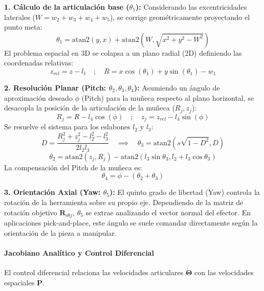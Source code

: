 \documentclass[12pt, a4paper]{article}
\begin{document}
\textbf{1. Cálculo de la articulación base ($\theta_1$):} 
Considerando las excentricidades laterales ($W = w_2 + w_3 + w_4 + w_5$), se corrige geométricamente proyectando el punto meta:
\begin{equation}
    \theta_1 = \text{atan2}(y, x) + \text{atan2}\left(W, \sqrt{x^2 + y^2 - W^2}\right)
\end{equation}
El problema espacial en 3D se colapsa a un plano radial (2D) definiendo las coordenadas relativas:
\begin{equation}
    z_{rel} = z - l_1 \quad ; \quad R = x\cos(\theta_1) + y\sin(\theta_1) - w_1
\end{equation}

\textbf{2. Resolución Planar (Pitch: $\theta_2, \theta_3, \theta_4$):}
Asumiendo un ángulo de aproximación deseado $\phi$ (Pitch) para la muñeca respecto al plano horizontal, se desacopla la posición de la articulación de la muñeca ($R_j, z_j$):
\begin{equation}
    R_j = R - l_4 \cos(\phi) \quad ; \quad z_j = z_{rel} - l_4 \sin(\phi)
\end{equation}
Se resuelve el sistema para los eslabones $l_2$ y $l_3$:
\begin{equation}
    D = \frac{R_j^2 + z_j^2 - l_2^2 - l_3^2}{2 l_2 l_3} \quad \implies \quad \theta_3 = \text{atan2}\left(s\sqrt{1 - D^2}, D\right)
\end{equation}
\begin{equation}
    \theta_2 = \text{atan2}(z_j, R_j) - \text{atan2}(l_3 \sin\theta_3, l_2 + l_3 \cos\theta_3)
\end{equation}
La compensación del Pitch de la muñeca es:
\begin{equation}
    \theta_4 = \phi - (\theta_2 + \theta_3)
\end{equation}

\textbf{3. Orientación Axial (Yaw: $\theta_5$):}
El quinto grado de libertad (Yaw) controla la rotación de la herramienta sobre su propio eje. Dependiendo de la matriz de rotación objetivo $\mathbf{R}_{obj}$, $\theta_5$ se extrae analizando el vector normal del efector. En aplicaciones pick-and-place, este ángulo se suele comandar directamente según la orientación de la pieza a manipular.

\paragraph{Jacobiano Analítico y Control Diferencial}
El control diferencial relaciona las velocidades articulares $\mathbf{\dot{\Theta}}$ con las velocidades espaciales $\mathbf{\dot{P}}$. 
\end{document}
